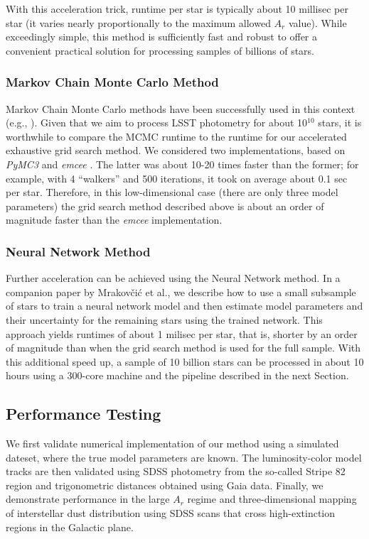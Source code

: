 With this acceleration trick, runtime per star is typically about 10 millisec per star  (it varies nearly proportionally to the maximum allowed $A_r$ value). 
While exceedingly simple, this method is sufficiently fast and robust to offer a convenient practical solution for processing samples of billions of stars. 


\subsubsection{Markov Chain Monte Carlo Method}
 
Markov Chain Monte Carlo methods have been successfully used in this context (e.g., \citealt{2014ApJ...783..114G}). 
Given that we aim to process LSST photometry for about 10$^{10}$ stars, it is worthwhile to compare the MCMC runtime
to the runtime for our accelerated exhaustive grid search method. We considered two implementations, based on {\it PyMC3} \citep{pymc2023} and
{\it emcee} \citep{2013PASP..125..306F}. The latter was about 10-20 times faster than the former; for example, with 4 ``walkers'' and 500
iterations, it took on average about 0.1 sec per star. Therefore, in this low-dimensional case (there are only three model parameters) the
grid search method described above is about an order of magnitude faster than the {\it emcee} implementation. 


\subsubsection{Neural Network Method}

Further acceleration can be achieved using the Neural Network method. In a companion paper by Mrakov\v{c}i\'{c} et al., we describe
how to use a small subsample of stars to train a neural network model and then estimate model parameters and their uncertainty for the remaining
stars using the trained network. This approach yields runtimes of about 1 milisec per star, that is, shorter by an order of magnitude than when
the grid search method is used for the full sample. With this additional speed up, a sample of 10 billion stars can be processed in
about 10 hours using a 300-core machine and the pipeline described in the next Section. 


\subsection{Performance Testing} 

We first validate numerical implementation of our method using a simulated dateset, where the true model parameters are known.
The luminosity-color model tracks are then validated using SDSS photometry from the so-called Stripe 82 region and trigonometric
distances obtained using Gaia data. Finally, we demonstrate
performance in the large $A_r$ regime and three-dimensional mapping of interstellar dust distribution using SDSS
scans that cross high-extinction regions in the Galactic plane.
 

